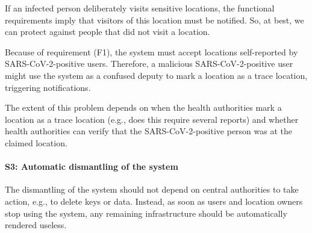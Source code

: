  If an infected person deliberately visits sensitive locations, the functional requirements imply that visitors of this location must be notified. So, at best, we can protect against people that did not visit a location.

 Because of requirement (F1), the system must accept locations self-reported by SARS-CoV-2-positive users. Therefore, a malicious SARS-CoV-2-positive user might use the system as a confused deputy to mark a location as a trace location, triggering notifications.

The extent of this problem depends on when the health authorities mark a location as a trace location (e.g., does this require several reports) and whether health authorities can verify that the SARS-CoV-2-positive person was at the claimed location.

\paragraph{S3: Automatic dismantling of the system}
The dismantling of the system should not depend on central authorities to take action, e.g., to delete keys or data. Instead, as soon as users and location owners stop using the system, any remaining infrastructure should be automatically rendered useless.
